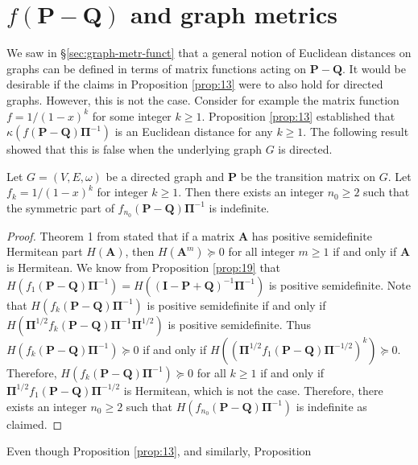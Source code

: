 \section{$f(\mathbf{P} - \mathbf{Q})$ and graph metrics}
\label{sec:fmathbfp-mathbfq-gra}
We saw in \S \ref{sec:graph-metr-funct} that a general notion of
Euclidean distances on graphs can be defined in terms of matrix
functions acting on $\mathbf{P} - \mathbf{Q}$. It would be desirable
if the claims in Proposition \ref{prop:13} were to also hold for
directed graphs. However, this is not the case. Consider for example
the matrix function $f = 1/(1-x)^{k}$ for some integer $k \geq
1$. Proposition \ref{prop:13} established that $\kappa(f(\mathbf{P} -
\mathbf{Q})\bm{\Pi}^{-1})$ is an Euclidean distance for any $k \geq
1$.  The following result showed that this is false when the
underlying graph $G$ is directed.
\begin{proposition}
  \label{prop:25}
  Let $G = (V,E,\omega)$ be a directed graph and $\mathbf{P}$ be the transition
  matrix on $G$. Let $f_k = 1/(1-x)^{k}$ for integer $k \geq 1$. Then
  there exists an integer $n_0 \geq 2$ such that the symmetric part of
  $f_{n_0}(\mathbf{P} - \mathbf{Q})\bm{\Pi}^{-1}$ is indefinite. 
\end{proposition}
\begin{proof}
  Theorem 1 from \citet{johnson75:_power_matric_posit_defin_real_part}
  stated that if a matrix $\mathbf{A}$ has positive semidefinite
  Hermitean part $H(\mathbf{A})$, then $H(\mathbf{A}^{m}) \succeq 0$ for all
  integer $m \geq 1$ if and only if $\mathbf{A}$ is Hermitean. We know
  from Proposition \ref{prop:19} that $H(f_1(\mathbf{P} -
  \mathbf{Q})\bm{\Pi}^{-1}) = H((\mathbf{I} - \mathbf{P} +
  \mathbf{Q})^{-1}\bm{\Pi}^{-1})$ is positive semidefinite. Note that
  $H(f_{k}(\mathbf{P} - \mathbf{Q})\bm{\Pi}^{-1})$ is positive
  semidefinite if and only if $H(\bm{\Pi}^{1/2}f_{k}(\mathbf{P} -
  \mathbf{Q}) \bm{\Pi}^{-1} \bm{\Pi}^{1/2})$ is positive
  semidefinite. Thus $H(f_{k}(\mathbf{P} - \mathbf{Q})\bm{\Pi}^{-1})
  \succeq 0$ if and only if $H((\bm{\Pi}^{1/2}f_{1}(\mathbf{P} -
  \mathbf{Q})\bm{\Pi}^{-1/2})^{k}) \succeq 0$. Therefore,
  $H(f_{k}(\mathbf{P} - \mathbf{Q})\bm{\Pi}^{-1}) \succeq 0$ for all
  $k \geq 1$ if and only if $\bm{\Pi}^{1/2}f_{1}(\mathbf{P} -
  \mathbf{Q})\bm{\Pi}^{-1/2}$ is Hermitean, which is not the
  case. Therefore, there exists an integer $n_0 \geq 2$ such that
  $H(f_{n_0}(\mathbf{P} - \mathbf{Q})\bm{\Pi}^{-1})$ is indefinite as
  claimed.
\end{proof}
%
%
Even though Proposition \ref{prop:13}, and similarly, Proposition
